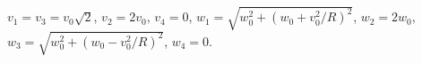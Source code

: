$v_1 = v_3 = v_0\sqrt{2}$, $v_2 = 2v_0$, $v_4 = 0$,
$w_1 = \sqrt{w^2_0 + (w_0 + v^2_0/R)^2}$, $w_2 = 2w_0$,
$w_3 = \sqrt{w^2_0 + (w_0 - v^2_0/R)^2}$, $w_4 = 0$.
